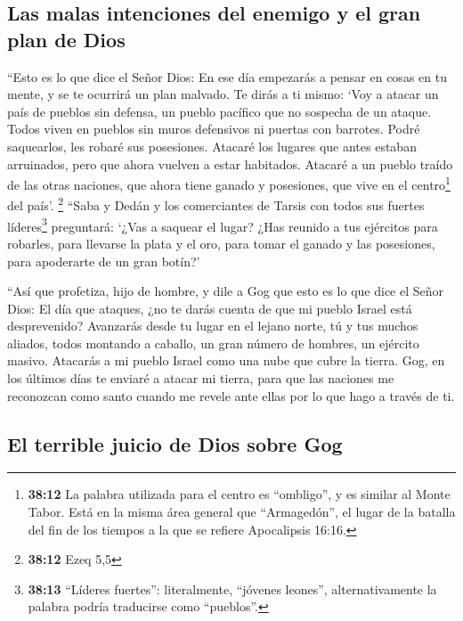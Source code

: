 \hypertarget{las-malas-intenciones-del-enemigo-y-el-gran-plan-de-dios}{%
\subsection{Las malas intenciones del enemigo y el gran plan de
Dios}\label{las-malas-intenciones-del-enemigo-y-el-gran-plan-de-dios}}

 ``Esto es lo que dice el Señor Dios: En ese día
empezarás a pensar en cosas en tu mente, y se te ocurrirá un plan
malvado.  Te dirás a ti mismo: `Voy a atacar un país de
pueblos sin defensa, un pueblo pacífico que no sospecha de un ataque.
Todos viven en pueblos sin muros defensivos ni puertas con barrotes.
 Podré saquearlos, les robaré sus posesiones. Atacaré los
lugares que antes estaban arruinados, pero que ahora vuelven a estar
habitados. Atacaré a un pueblo traído de las otras naciones, que ahora
tiene ganado y posesiones, que vive en el centro\footnote{\textbf{38:12}
  La palabra utilizada para el centro es ``ombligo'', y es similar al
  Monte Tabor. Está en la misma área general que ``Armagedón'', el lugar
  de la batalla del fin de los tiempos a la que se refiere Apocalipsis
  16:16.} del país'. \footnote{\textbf{38:12} Ezeq 5,5} 
``Saba y Dedán y los comerciantes de Tarsis con todos sus fuertes
líderes\footnote{\textbf{38:13} ``Líderes fuertes'': literalmente,
  ``jóvenes leones'', alternativamente la palabra podría traducirse como
  ``pueblos''.} preguntará: `¿Vas a saquear el lugar? ¿Has reunido a tus
ejércitos para robarles, para llevarse la plata y el oro, para tomar el
ganado y las posesiones, para apoderarte de un gran botín?'

 ``Así que profetiza, hijo de hombre, y dile a Gog que
esto es lo que dice el Señor Dios: El día que ataques, ¿no te darás
cuenta de que mi pueblo Israel está desprevenido? 
Avanzarás desde tu lugar en el lejano norte, tú y tus muchos aliados,
todos montando a caballo, un gran número de hombres, un ejército masivo.
 Atacarás a mi pueblo Israel como una nube que cubre la
tierra. Gog, en los últimos días te enviaré a atacar mi tierra, para que
las naciones me reconozcan como santo cuando me revele ante ellas por lo
que hago a través de ti.

\hypertarget{el-terrible-juicio-de-dios-sobre-gog}{%
\subsection{El terrible juicio de Dios sobre
Gog}\label{el-terrible-juicio-de-dios-sobre-gog}}

